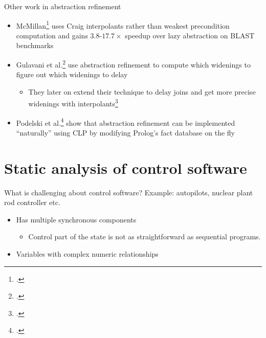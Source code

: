 \documentclass[aspectratio=169,notes]{beamer}
\begin{document}
\begin{frame}{Other work in abstraction refinement}
  \begin{itemize}[<+->]
  \item McMillan\footcite{mcmillan2006lazy} uses Craig interpolants rather than weakest precondition computation and gains $3.8$-$17.7\times$ speedup over lazy abstraction on BLAST benchmarks
  \item Gulavani et al.\footcite{gulavani2006counterexample} use abstraction refinement to compute which widenings to figure out which widenings to delay
    \begin{itemize}
    \item They later on extend their technique to delay joins and get more precise widenings with interpolants\footcite{gulavani2008automatically}
    \end{itemize}
    \item Podelski et al.\footcite{podelski2007armc} show that abstraction refinement can be implemented ``naturally'' using CLP by modifying Prolog's fact database on the fly
  \end{itemize}
\end{frame}

\section{Static analysis of control software}
\begin{frame}{What is challenging about control software?}
  Example: autopilots, nuclear plant rod controller etc.
  
  \begin{itemize}
  \item<2-> Has multiple synchronous components\pause
    \begin{itemize}
    \item<3-> Control part of the state is not as straightforward as sequential programs. 
    \end{itemize}
  \item<5-> Variables with complex numeric relationships
  \end{itemize}
\end{frame}
\end{document}

